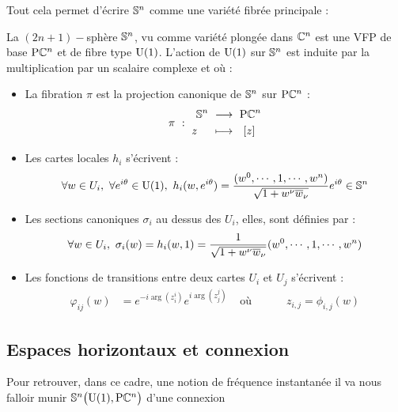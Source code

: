 Tout cela permet d'écrire $\S{n}$ comme une variété fibrée principale :
\begin{proposition}
	La $(2n+1)-$sphère $\S{n}$, vu comme variété plongée dans $\C^n$ est une VFP de base $\PC{n}$ et de fibre type $\U{1}$. L'action de $\U{1}$ sur $\S{n}$ est induite par la multiplication par un scalaire complexe et où :
	\begin{itemize}
		\item La fibration $\pi$ est la projection canonique de $\S{n}$ sur $\PC{n}$ :
		\begin{equation}
			\pi\ :\ \begin{aligned} \S{n}\ &\lr\ \PC{n} \\ z\quad\ &\lmt\ \ [z]\end{aligned}
		\end{equation}
		
		\item Les cartes locales $h_i$ s'écrivent :
		\begin{equation}
			\forall w \in U_i,\ \forall e^{i\theta}\in\U{1},\  h_i(w,e^{i\theta}) = \frac{(w^0,\cdots, 1,\cdots, w^n)}{\sqrt{1 + w^\nu \congu{w}_\nu}}e^{i\theta} \in \S{n}
		\end{equation}
		
		\item Les sections canoniques $\sigma_i$ au dessus des $U_i$, elles,  sont définies par :
		\begin{equation}
			\forall w \in U_i,\ \sigma_i(w) = h_i(w, 1) = \frac{1}{\sqrt{1 + w^\nu \congu{w}_\nu}}(w^0,\cdots, 1,\cdots, w^n)
		\end{equation}
		
		\item Les fonctions de transitions entre deux cartes $U_i$ et $U_j$ s'écrivent :
		\begin{align}
			\varphi_{ij}(w) &= e^{-i \arg (z_i^i)} e^{i \arg (z_j^j)}  &  \text{ où }&\qquad z_{i,j} = \phi_{i,j}(w)
		\end{align}
	\end{itemize}
\end{proposition}
\skipl




\subsection{Espaces horizontaux et connexion}\label{subsec:connexion2VFP}

Pour retrouver, dans ce cadre, une notion de fréquence instantanée il va nous falloir munir $\VFP$ d'une connexion

